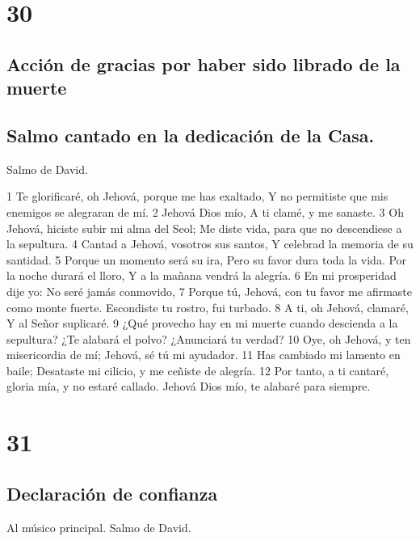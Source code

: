 \chapter{30}

\section*{Acción de gracias por haber sido librado de la muerte}

\section*{Salmo cantado en la dedicación de la Casa.}

Salmo de David.

1 Te glorificaré, oh Jehová, porque me has exaltado,
Y no permitiste que mis enemigos se alegraran de mí.
2 Jehová Dios mío,
A ti clamé, y me sanaste.
3 Oh Jehová, hiciste subir mi alma del Seol;
Me diste vida, para que no descendiese a la sepultura.
4 Cantad a Jehová, vosotros sus santos,
Y celebrad la memoria de su santidad.
5 Porque un momento será su ira,
Pero su favor dura toda la vida.
Por la noche durará el lloro,
Y a la mañana vendrá la alegría.
6 En mi prosperidad dije yo:
No seré jamás conmovido,
7 Porque tú, Jehová, con tu favor me afirmaste como monte fuerte.
Escondiste tu rostro, fui turbado.
8 A ti, oh Jehová, clamaré,
Y al Señor suplicaré.
9 ¿Qué provecho hay en mi muerte cuando descienda a la sepultura?
¿Te alabará el polvo? ¿Anunciará tu verdad?
10 Oye, oh Jehová, y ten misericordia de mí;
Jehová, sé tú mi ayudador.
11 Has cambiado mi lamento en baile;
Desataste mi cilicio, y me ceñiste de alegría.
12 Por tanto, a ti cantaré, gloria mía, y no estaré callado.
Jehová Dios mío, te alabaré para siempre.

\chapter{31}

\section*{Declaración de confianza}

Al músico principal. Salmo de David.

